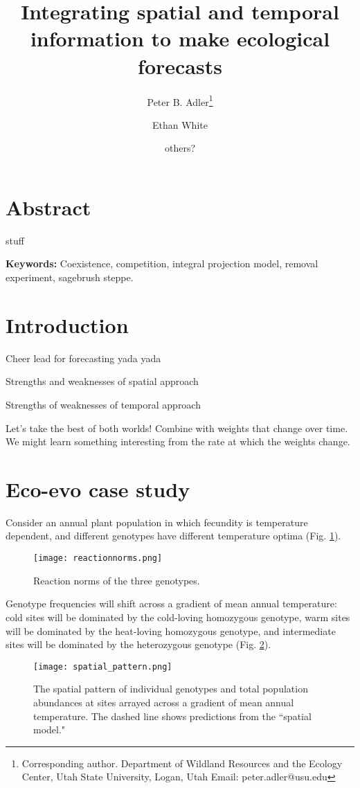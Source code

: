 \documentclass[11pt]{article}
\title{Integrating spatial and temporal information to make ecological forecasts }
\author[1]{Peter B. Adler\thanks{Corresponding author. Department of Wildland Resources and the Ecology Center, Utah State University, Logan, Utah Email: peter.adler@usu.edu}}
\author[2]{Ethan White}
\author[3]{others?}
\affil[1]{Department of Wildland Resources and the Ecology Center, Utah State University, Logan, Utah}
\affil[2]{some shitty Florida joint}
\affil[3]{??}
\begin{document}
\maketitle

\linenumbers

\section*{Abstract}

stuff

\textbf{\large{Keywords:}} Coexistence, competition, integral projection model, removal experiment, sagebrush steppe. 

\section*{Introduction}

Cheer lead for forecasting yada yada 

Strengths and weaknesses of spatial approach

Strengths of weaknesses of temporal approach

Let's take the best of both worlds! Combine with weights that change over time. We might learn something interesting from the rate at which the weights change.

\section*{Eco-evo case study}

Consider an annual plant population in which fecundity is temperature dependent, and different genotypes have different temperature optima (Fig. \ref{fig:RxnNorms}).

\begin{figure}[tbp]
\centering
\texttt{[image: reactionnorms.png]}
\caption{Reaction norms of the three genotypes.}
\label{fig:RxnNorms}
\end{figure}

Genotype frequencies will shift across a gradient of mean annual temperature: cold sites will be dominated by the cold-loving homozygous genotype, warm sites will be dominated by the heat-loving homozygous genotype, and intermediate sites will be dominated by the heterozygous genotype (Fig. \ref{fig:SpatialPattern}).

\begin{figure}[tbp]
\centering
\texttt{[image: spatial\_pattern.png]}
\caption{The spatial pattern of individual genotypes and total population abundances at sites arrayed across a gradient of mean annual temperature. The dashed line shows predictions from the ``spatial model."}
\label{fig:SpatialPattern}
\end{figure}
\end{document}
